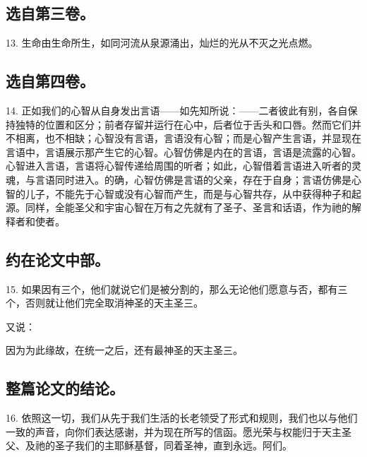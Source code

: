 \subsection{选自第三卷。}

13. 生命由生命所生，如同河流从泉源涌出，灿烂的光从不灭之光点燃。\par


\subsection{选自第四卷。}

14. 正如我们的心智从自身发出言语——如先知所说：——二者彼此有别，各自保持独特的位置和区分；前者存留并运行在心中，后者位于舌头和口唇。然而它们并不相离，也不相缺；心智没有言语，言语没有心智；而是心智产生言语，并显现在言语中，言语展示那产生它的心智。心智仿佛是内在的言语，言语是流露的心智。心智进入言语，言语将心智传递给周围的听者；如此，心智借着言语进入听者的灵魂，与言语同时进入。的确，心智仿佛是言语的父亲，存在于自身；言语仿佛是心智的儿子，不能先于心智或没有心智而产生，而是与心智共存，从中获得种子和起源。同样，全能圣父和宇宙心智在万有之先就有了圣子、圣言和话语，作为祂的解释者和使者。\par


\subsection{约在论文中部。}

15. 如果因有三个，他们就说它们是被分割的，那么无论他们愿意与否，都有三个，否则就让他们完全取消神圣的天主圣三。\par

又说：\par

因为为此缘故，在统一之后，还有最神圣的天主圣三。\par


\subsection{整篇论文的结论。}

16. 依照这一切，我们从先于我们生活的长老领受了形式和规则，我们也以与他们一致的声音，向你们表达感谢，并为现在所写的信函。愿光荣与权能归于天主圣父、及祂的圣子我们的主耶稣基督，同着圣神，直到永远。阿们。\par

